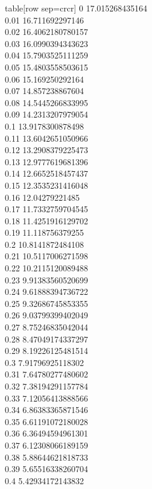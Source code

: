   table[row sep=crcr]{%
0	17.015268435164\\
0.01	16.711692297146\\
0.02	16.4062180780157\\
0.03	16.0990394343623\\
0.04	15.7903525111259\\
0.05	15.4803558503615\\
0.06	15.169250292164\\
0.07	14.857238867604\\
0.08	14.5445266833995\\
0.09	14.2313207979054\\
0.1	13.9178300878498\\
0.11	13.6042651050966\\
0.12	13.2908379225473\\
0.13	12.9777619681396\\
0.14	12.6652518457437\\
0.15	12.3535231416048\\
0.16	12.04279221485\\
0.17	11.7332759704545\\
0.18	11.4251916129702\\
0.19	11.118756379255\\
0.2	10.8141872484108\\
0.21	10.5117006271598\\
0.22	10.2115120089488\\
0.23	9.91383560520699\\
0.24	9.61888394736722\\
0.25	9.32686745853355\\
0.26	9.03799399402049\\
0.27	8.75246835042044\\
0.28	8.47049174337297\\
0.29	8.19226125481514\\
0.3	7.91796925118302\\
0.31	7.64780277480602\\
0.32	7.38194291157784\\
0.33	7.12056413888566\\
0.34	6.86383365871546\\
0.35	6.61191072180028\\
0.36	6.36494594961301\\
0.37	6.12308066189159\\
0.38	5.88644621818733\\
0.39	5.65516338260704\\
0.4	5.42934172143832\\
}
